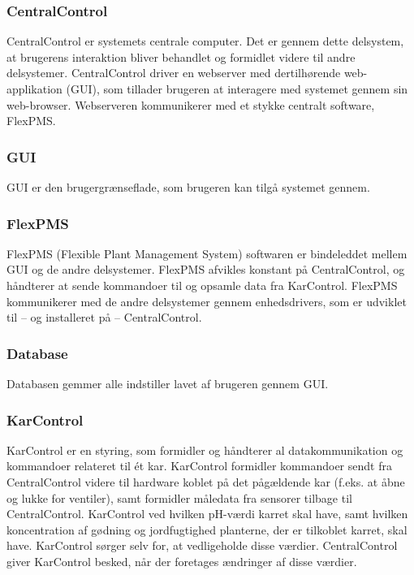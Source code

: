 \subsubsection{CentralControl}
CentralControl er systemets centrale computer. Det er gennem dette delsystem, at brugerens interaktion bliver behandlet og formidlet videre til andre delsystemer. CentralControl driver en webserver med dertilhørende web-applikation (GUI), som tillader brugeren at interagere med systemet gennem sin web-browser. Webserveren kommunikerer med et stykke centralt software, FlexPMS.

\subsubsection{GUI}
GUI er den brugergrænseflade, som brugeren kan tilgå systemet gennem.

\subsubsection{FlexPMS}
FlexPMS (Flexible Plant Management System) softwaren er bindeleddet mellem GUI og de andre delsystemer. FlexPMS afvikles konstant på CentralControl, og håndterer at sende kommandoer til og opsamle data fra KarControl. FlexPMS kommunikerer med de andre delsystemer gennem enhedsdrivers, som er udviklet til – og installeret på – CentralControl.

\subsubsection{Database}
Databasen gemmer alle indstiller lavet af brugeren gennem GUI.

\subsubsection{KarControl}
KarControl er en styring, som formidler og håndterer al datakommunikation og kommandoer relateret til ét kar. KarControl formidler kommandoer sendt fra CentralControl videre til hardware koblet på det pågældende kar (f.eks. at åbne og lukke for ventiler), samt formidler måledata fra sensorer tilbage til CentralControl. KarControl ved hvilken pH-værdi karret skal have, samt hvilken koncentration af gødning og jordfugtighed planterne, der er tilkoblet karret, skal have. KarControl sørger selv for, at vedligeholde disse værdier. CentralControl giver KarControl besked, når der foretages ændringer af disse værdier.

